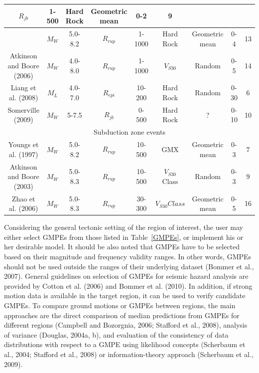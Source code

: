 \begin{landscape}
\begin{table}[!t]
\begin{tabular}{|c|c|c|c|c|c|c|c|c|}
$R_{jb}$& 1-500& Hard Rock & Geometric mean & 0-2 & 9\\
\hline {\footnotesize \citet{eqrm_Campbell03a}} & $M_W$ & 5.0-8.2 &
$R_{rup}$& 1-1000& Hard Rock & Geometric mean & 0-4 & 13\\
\hline {\footnotesize Atkinson and Boore (2006)} & $M_W$ & 4.0-8.0 &
$R_{rup}$& 1-1000& $V_{S30}$ & Random & 0-5 & 14 \\
\hline {\footnotesize Liang et al. (2008)} & $M_L$ & 4.0-7.0 &
$R_{epi}$& 10-200& Hard Rock & Random & 0-30 & 6\\
\hline {\footnotesize Somerville (2009)} & $M_W$ &5-7.5  &
$R_{jb}$& 0-500& Hard Rock &  ?& 0-10 & 10\\

\hline \multicolumn{9}{|c|}{Subduction zone events}\\
\hline {\footnotesize Youngs et al. (1997)} & $M_W$ & 5.0-8.2 &
$R_{rup}$& 10-500& GMX & Geometric mean & 0-3 & 7\\
\hline {\footnotesize Atkinson and Boore (2003)} & $M_W$ & 5.0-8.3 &
$R_{rup}$& 10-500& $V_{S30}$ Class & Random & 0-3 & 9\\
\hline {\footnotesize Zhao et al. (2006)} & $M_W$ & 5.0-8.3 &
$R_{rup}$ &
30-300& $V_{S30} Class$ & Geometric mean & 0-5 & 16\\
\hline

\end{tabular}
\end{table}
\end{landscape}

Considering the general tectonic setting of the region of interest,
the user may either select GMPEs from those listed in
Table~\ref{GMPEs}, or implement his or her desirable model. It
should be also noted that GMPEs have to be selected based on their
magnitude and frequency validity ranges. In other words, GMPEs
should not be used outside the ranges of their underlying dataset
(Bommer et al., 2007). General guidelines on selection of GMPEs for
seismic hazard analysis are provided by Cotton et al. (2006) and
Bommer et al. (2010). In addition, if strong motion data is
available in the target region, it can be used to verify candidate
GMPEs. To compare ground motions or GMPEs between regions, the main
approaches are the direct comparison of median predictions from
GMPEs for different regions (Campbell and Bozorgnia, 2006; Stafford
et al., 2008), analysis of variance (Douglas, 2004a, b), and
evaluation of the consistency of data distributions with respect to
a GMPE using likelihood concepts (Scherbaum et al., 2004; Stafford
et al., 2008) or information-theory approach (Scherbaum et al.,
2009).

